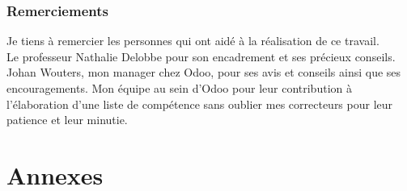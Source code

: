 \documentclass[a4paper,11pt]{report}
\begin{document}
 
\newpage

\hfill\begin{minipage}[c]{0.65\textwidth}

\vspace{5cm}
\section*{Remerciements}
Je tiens à remercier les personnes qui ont aidé à la réalisation de ce travail. \\ 

Le professeur Nathalie Delobbe pour son encadrement et ses précieux conseils. Johan Wouters, mon manager chez Odoo, pour ses avis et conseils ainsi que ses encouragements. Mon équipe au sein d'Odoo pour leur contribution à l'élaboration d'une liste de compétence sans oublier mes correcteurs pour leur patience et leur minutie.
\end{minipage} 
\newpage
\tableofcontents  %

 
 

 



\label{Bibliographie}
 



\part*{Annexes}
\appendix




\end{document}
